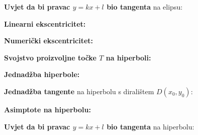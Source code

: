 \documentclass[9pt,oneside,a4paper]{report}
\begin{document}
\vspace{1mm}
\noindent
\textbf{Uvjet da bi pravac $y=kx+l$ bio tangenta} na elipsu:
\hspace{5mm}

\vspace{1mm}
\noindent
\textbf{Linearni ekscentricitet:}\hspace{5mm}

\vspace{1mm}
\noindent
\textbf{Numeri\v{c}ki ekscentricitet:}
\hspace{5mm}

\begin{floatingfigure}[r]{6cm}
\end{floatingfigure}

\vspace{3mm}
\noindent
{}

\vspace{3mm}\noindent
\textbf{Svojstvo proizvoljne to\v{c}ke $T$ na hiperboli:}\\
\hspace*{20mm}


\vspace{3mm}\noindent
\textbf{Jednad\v{z}ba hiperbole:}\\
\hspace*{10mm}
\hspace*{5mm}

\vspace{3mm}\noindent
\noindent
\textbf{Jednad\v{z}ba tangente} na hiperbolu s dirali\v{s}tem
$D(x_0,y_0)$:\\
\hspace*{20mm}

\vspace{3mm}\noindent
\noindent
\textbf{Asimptote na hiperbolu:}\\
\hspace*{10mm}
\hspace*{5mm}

\vspace{1mm}
\noindent
\textbf{Uvjet da bi pravac $y=kx+l$ bio tangenta} na hiperbolu:
\hspace{5mm}
\end{document}
